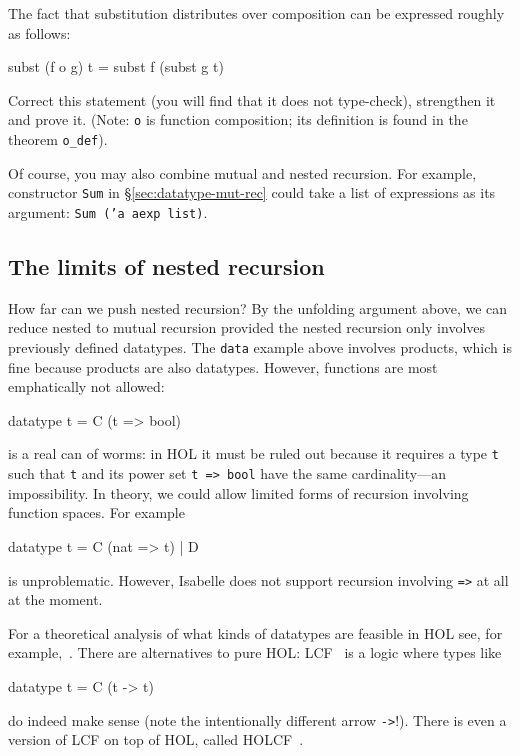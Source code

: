 \begin{exercise}
The fact that substitution distributes over composition can be expressed
roughly as follows:
\begin{ttbox}
subst (f o g) t = subst f (subst g t)
\end{ttbox}
Correct this statement (you will find that it does not type-check),
strengthen it and prove it. (Note: \texttt{o} is function composition; its
definition is found in the theorem \texttt{o_def}).
\end{exercise}


Of course, you may also combine mutual and nested recursion. For example,
constructor \texttt{Sum} in \S\ref{sec:datatype-mut-rec} could take a list of
expressions as its argument: \texttt{Sum ('a aexp list)}.


\subsection{The limits of nested recursion}

How far can we push nested recursion? By the unfolding argument above, we can
reduce nested to mutual recursion provided the nested recursion only involves
previously defined datatypes. The \texttt{data} example above involves
products, which is fine because products are also datatypes.
However, functions are most emphatically not allowed:
\begin{ttbox}
datatype t = C (t => bool)
\end{ttbox}
is a real can of worms: in HOL it must be ruled out because it requires a
type \texttt{t} such that \texttt{t} and its power set \texttt{t => bool}
have the same cardinality---an impossibility.
In theory, we could allow limited forms of recursion involving function
spaces. For example
\begin{ttbox}
datatype t = C (nat => t) | D
\end{ttbox}
is unproblematic. However, Isabelle does not support recursion involving
\texttt{=>} at all at the moment.

For a theoretical analysis of what kinds of datatypes are feasible in HOL
see, for example,~\cite{Gunter-HOL92}. There are alternatives to pure HOL:
LCF~\cite{paulson87} is a logic where types like
\begin{ttbox}
datatype t = C (t -> t)
\end{ttbox}
do indeed make sense (note the intentionally different arrow \texttt{->}!).
There is even a version of LCF on top of HOL, called
HOLCF~\cite{MuellerNvOS99}.


